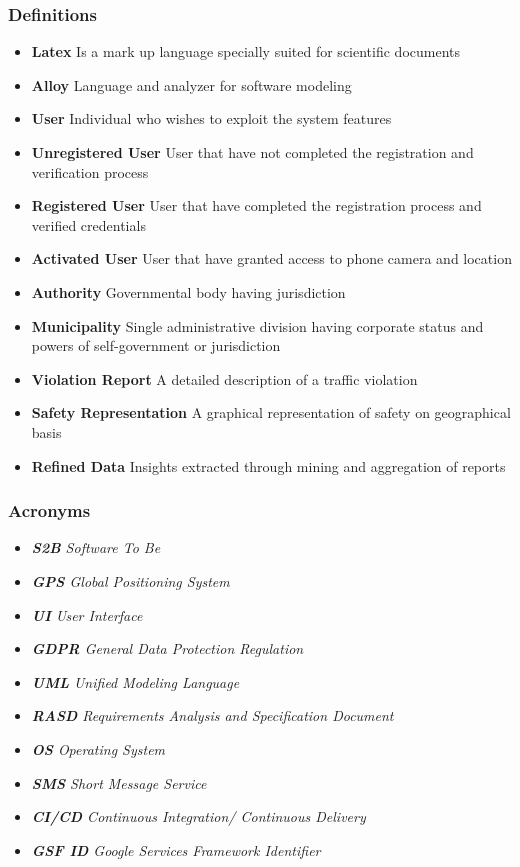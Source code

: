 \subsubsection{Definitions}
\begin{itemize}
\item[] \textbf{Latex} Is a mark up language specially suited for scientific documents
\item[] \textbf{Alloy} Language and analyzer for software modeling
\item[] \textbf{User} Individual who wishes to exploit the system features
\item[] \textbf{Unregistered User} User that have not completed the registration and verification process
\item[] \textbf{Registered User} User that have completed the registration process and verified credentials
\item[] \textbf{Activated User} User that have granted access to phone camera and location
\item[] \textbf{Authority} Governmental body having jurisdiction
\item[] \textbf{Municipality} Single administrative division having corporate status and powers of self-government or jurisdiction
\item[] \textbf{Violation Report} A detailed description of a traffic violation
\item[] \textbf{Safety Representation} A graphical representation of safety on geographical basis
\item[] \textbf{Refined Data} Insights extracted through mining and aggregation of reports
\end{itemize}

\subsubsection{Acronyms}
\begin{itemize}
\item[] \emph{\textbf{S2B} Software To Be}
\item[] \emph{\textbf{GPS} Global Positioning System}
\item[] \emph{\textbf{UI} User Interface}
\item[] \emph{\textbf{GDPR} General Data Protection Regulation}
\item[] \emph{\textbf{UML} Unified Modeling Language}
\item[] \emph{\textbf{RASD} Requirements Analysis and Specification Document}
\item[] \emph{\textbf{OS} Operating System}
\item[] \emph{\textbf{SMS} Short Message Service}
\item[] \emph{\textbf{CI/CD} Continuous Integration/ Continuous Delivery}
\item[] \emph{\textbf{GSF ID} Google Services Framework Identifier}
\end{itemize}